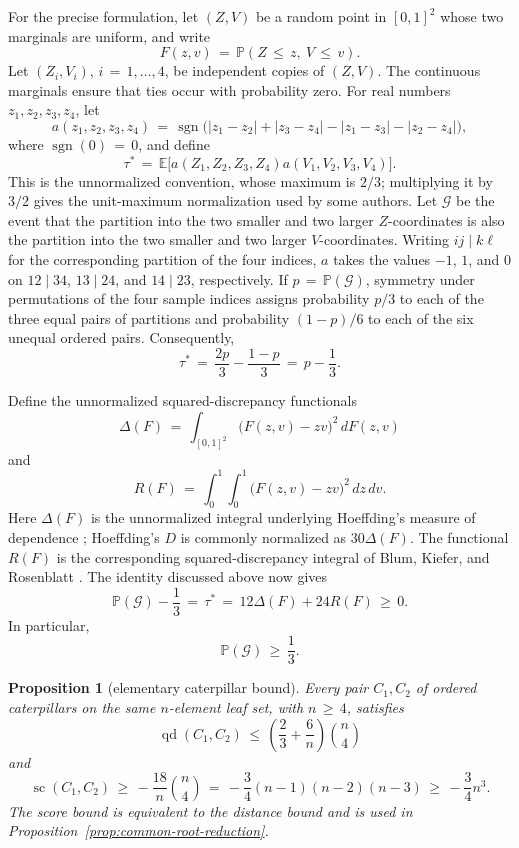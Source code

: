 \documentclass[11pt]{article}
\newtheorem{proposition}[theorem]{Proposition}
\theoremstyle{definition}
\newcommand{\qd}{\operatorname{qd}}
\newcommand{\score}{\operatorname{sc}}
\begin{document}
For the precise formulation, let $(Z,V)$ be a random
point in $[0,1]^2$ whose two marginals are uniform, and write
\[
 F(z,v)\,=\,\mathbb P(Z\,\leq\,z,\ V\,\leq\,v).
\]
Let $(Z_i,V_i)$, $i\,=\,1,\ldots,4$, be independent copies of $(Z,V)$.  The continuous
marginals ensure that ties occur with probability zero.  For real numbers
$z_1,z_2,z_3,z_4$, let
\[
 a(z_1,z_2,z_3,z_4)
 \,=\,\operatorname{sgn}\bigl(
 |z_1-z_2|+|z_3-z_4|-|z_1-z_3|-|z_2-z_4|
 \bigr),
\]
where $\operatorname{sgn}(0)\,=\,0$, and define
\[
 \tau^*\,=\,
 \mathbb E\bigl[a(Z_1,Z_2,Z_3,Z_4)a(V_1,V_2,V_3,V_4)\bigr].
\]
This is the unnormalized convention, whose maximum is $2/3$; multiplying it
by $3/2$ gives the unit-maximum normalization used by some authors.
Let $\mathcal G$ be the event that the partition into the two smaller and
two larger $Z$-coordinates is also the partition into the two smaller and
two larger $V$-coordinates.  Writing $ij\mid k\ell$ for the corresponding
partition of the four indices, $a$ takes the values $-1$, $1$, and $0$ on
$12\mid34$, $13\mid24$, and $14\mid23$, respectively.  If
$p\,=\,\mathbb P(\mathcal G)$, symmetry under permutations of the four sample
indices assigns probability $p/3$ to each of the three equal pairs of
partitions and probability $(1-p)/6$ to each of the six unequal ordered
pairs.  Consequently,
\[
 \tau^*\,=\,\frac{2p}{3}-\frac{1-p}{3}
 \,=\,p-\frac13.
\]

Define the unnormalized squared-discrepancy functionals
\[
 \Delta(F)
 \,=\,\int_{[0,1]^2}\bigl(F(z,v)-zv\bigr)^2\,dF(z,v)
\]
and
\[
 R(F)
 \,=\,\int_0^1\int_0^1
       \bigl(F(z,v)-zv\bigr)^2\,dz\,dv.
\]
Here $\Delta(F)$ is the unnormalized integral underlying Hoeffding's measure
of dependence \cite{Hoeffding_1948}; Hoeffding's $D$ is commonly normalized
as $30\Delta(F)$.  The functional $R(F)$ is the corresponding
squared-discrepancy integral of Blum, Kiefer, and Rosenblatt
\cite{Blum_1961}.  The identity discussed above now gives
\begin{equation}\label{eq:four-point-square-identity}
 \mathbb P(\mathcal G)-\frac13
 \,=\,\tau^*\,=\,12\Delta(F)+24R(F)\,\geq\,0.
\end{equation}
In particular,
\begin{equation}\label{eq:four-point-one-third}
 \mathbb P(\mathcal G)\,\geq\,\frac13.
\end{equation}

\begin{proposition}[elementary caterpillar bound]
\label{prop:elementary-caterpillar}
Every pair $C_1,C_2$ of ordered caterpillars on the same $n$-element leaf set,
with $n\,\geq\,4$, satisfies
\[
 \qd(C_1,C_2)
 \,\leq\,\left(\frac23+\frac6n\right)\binom n4
\]
and
\[
 \score(C_1,C_2)
 \,\geq\,-\frac{18}{n}\binom n4
 \,=\,-\frac34(n-1)(n-2)(n-3)
 \,\geq\,-\frac34n^3.
\]
The score bound is equivalent to the distance bound and is used in
Proposition~\ref{prop:common-root-reduction}.
\end{proposition}
\end{document}
